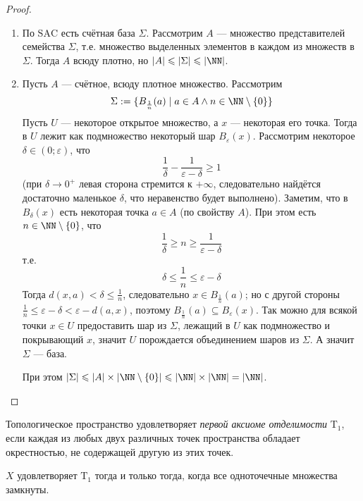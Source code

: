 \documentclass[12pt,a4paper]{article}
\newcommand{\SAC}{\ensuremath{\mathrm{SAC}}\xspace}
\newcommand{\T}{\ensuremath{\mathrm{T}}\xspace}
\begin{document}
    \begin{proof}\ 
        \begin{enumerate}
            \item По \SAC есть счётная база $\Sigma$. Рассмотрим $A$ --- множество представителей семейства $\Sigma$, т.е. множество выделенных элементов в каждом из множеств в $\Sigma$. Тогда $A$ всюду плотно, но $|A| \leqslant |\Sigma| \leqslant |\NN|$.

            \item Пусть $A$ --- счётное, всюду плотное множество. Рассмотрим
                \[\Sigma := \{B_{\frac{1}{n}}(a) \mid a \in A \wedge n \in \NN \setminus \{0\}\}\]
                Пусть $U$ --- некоторое открытое множество, а $x$ --- некоторая его точка. Тогда в $U$ лежит как подмножество некоторый шар $B_\varepsilon(x)$. Рассмотрим некоторое $\delta \in (0; \varepsilon)$, что
                \[\frac{1}{\delta} - \frac{1}{\varepsilon - \delta} \geqslant 1\]
                (при $\delta \to 0^+$ левая сторона стремится к $+\infty$, следовательно найдётся достаточно маленькое $\delta$, что неравенство будет выполнено). Заметим, что в $B_\delta(x)$ есть некоторая точка $a \in A$ (по свойству $A$). При этом есть $n \in \NN \setminus \{0\}$, что
                \[\frac{1}{\delta} \geqslant n \geqslant \frac{1}{\varepsilon - \delta}\]
                т.е.
                \[\delta \leqslant \frac{1}{n} \leqslant \varepsilon - \delta\]
                Тогда $d(x, a) < \delta \leqslant \frac{1}{n}$, следовательно $x \in B_{\frac{1}{n}}(a)$; но с другой стороны $\frac{1}{n} \leqslant \varepsilon - \delta < \varepsilon - d(a, x)$, поэтому $B_\frac{1}{n}(a) \subseteq B_\varepsilon(x)$. Так можно для всякой точки $x \in U$ предоставить шар из $\Sigma$, лежащий в $U$ как подмножество и покрывающий $x$, значит $U$ порождается объединением шаров из $\Sigma$. А значит $\Sigma$ --- база.

                При этом $|\Sigma| \leqslant |A| \times |\NN \setminus \{0\}| \leqslant |\NN| \times |\NN| = |\NN|$.
        \end{enumerate}
    \end{proof}

    \begin{definition}
        Топологическое пространство удовлетворяет \emph{первой аксиоме отделимости} $\T_1$, если каждая из любых двух различных точек пространства обладает окрестностью, не содержащей другую из этих точек.
    \end{definition}

    \begin{theorem}
        $X$ удовлетворяет $\T_1$ тогда и только тогда, когда все одноточечные множества замкнуты.
    \end{theorem}
\end{document}
